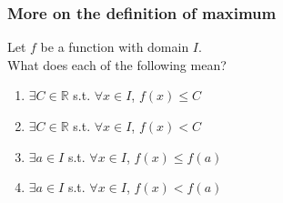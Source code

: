 \documentclass[14pt]{beamer}
\begin{document}
	\begin{frame}
		\frametitle{More on the definition of maximum}

		Let $f$ be a function with domain $I$. \\ What does each of the following mean?

		\begin{enumerate}
			\item $\displaystyle \exists C \in \mathbb{R}$ s.t.
				$\displaystyle \forall x \in I$, $\displaystyle f(x) \leq C$

			\item $\displaystyle \exists C \in \mathbb{R}$ s.t.
				$\displaystyle \forall x \in I$, $\displaystyle f(x) < C$

			\item $\displaystyle \exists a \in I$ s.t. $\displaystyle \forall x \in I$,
				$\displaystyle f(x) \leq f(a)$

			\item $\displaystyle \exists a \in I$ s.t. $\displaystyle \forall x \in I$,
				$\displaystyle f(x) < f(a)$
		\end{enumerate}
	\end{frame}


\end{document}

